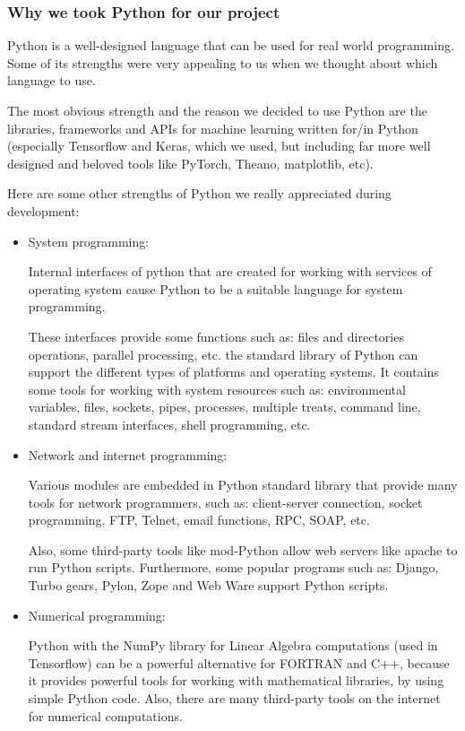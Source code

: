 \subsubsection{Why we took Python for our project}

Python is a well-designed language that can be used for
real world programming. Some of its strengths were very
appealing to us when we thought about which language to
use.

The most obvious strength and the reason we decided to use
Python are the libraries,
frameworks and APIs for machine learning written for/in
Python (especially Tensorflow and Keras, which we used, but
including far more well designed and beloved tools like
PyTorch, Theano, matplotlib, etc).

Here are some other strengths of Python we really
appreciated during development:

\begin{itemize}

  \item System programming:

        Internal interfaces of python that are created for
        working with services of operating system cause
        Python to be a suitable language for system
        programming.

        These interfaces provide some functions such as:
        files and directories operations, parallel
        processing, etc. the standard library of Python can
        support the different types of platforms and
        operating systems. It contains some tools for
        working with system resources such as:
        environmental variables, files, sockets, pipes,
        processes, multiple treats, command line, standard
        stream interfaces, shell programming, etc.
        \cite{amjad21}


  \item Network and internet programming:

        Various modules are embedded in Python standard
        library that provide many tools for network
        programmers, such as: client-server connection,
        socket programming, FTP, Telnet, email functions,
        RPC, SOAP, etc.

        Also, some third-party tools like mod-Python allow
        web servers like apache to run Python scripts.
        Furthermore, some popular programs such as: Django,
        Turbo gears, Pylon, Zope and Web Ware support
        Python scripts.\cite{amjad21}

  \item Numerical programming:

        Python with the NumPy library for Linear Algebra
        computations (used in Tensorflow) can be a powerful
        alternative for FORTRAN and C++, because it
        provides powerful tools for working with
        mathematical libraries, by using simple Python
        code. Also, there are many third-party tools on
        the internet for numerical computations.

\end{itemize}
